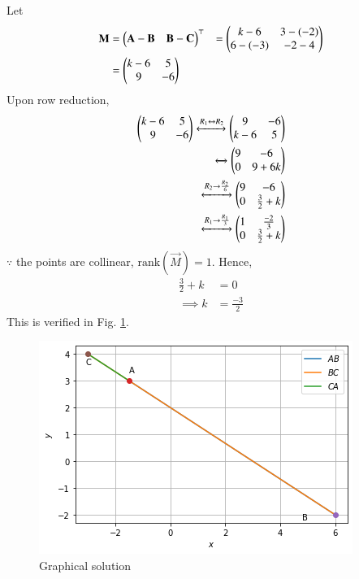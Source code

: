 

Let
\begin{align}
  \mathbf{M} &=  \begin{pmatrix}\mathbf{A}-\mathbf{B}&\mathbf{B}-\mathbf{C}\end{pmatrix}^{\top}
  & = \begin{pmatrix}k-6&3-(-2)\\6-(-3)&-2-4\end{pmatrix} \\
  & =   \begin{pmatrix}k-6&5\\9&-6\end{pmatrix}
\end{align}
Upon row reduction,
\begin{align}
\begin{pmatrix}k-6&5\\9&-6\end{pmatrix}
\xleftrightarrow{R_1\leftrightarrow R_2}
\begin{pmatrix}9&-6\\k-6&5\end{pmatrix}
\\
\xleftrightarrow[]{}
\begin{pmatrix}9&-6\\0&9+6k\end{pmatrix}
\\
\xleftrightarrow{R_2\rightarrow\frac{R_2}{6}}
\begin{pmatrix}9&-6\\0&\frac{3}{2}+k\end{pmatrix}
\\
\xleftrightarrow{R_1\rightarrow \frac{R_1}{3}}
\begin{pmatrix}1&\frac{-2}{3}\\0&\frac{3}{2}+k\end{pmatrix}
\end{align}
$\because$ the points are collinear, $\text{rank}(\vec{M})=1$.  Hence, 
\begin{align}
 \frac{3}{2}+k&=0 \\
\implies k&=\frac{-3}{2}
 \end{align}
This is verified in Fig.     \ref{vec/2008/14/Graphical solution}.
\begin{figure}[ht]
    \centering
    \includegraphics[width=\columnwidth]{vectors/solutions/2008/14/Collinear.png}
    \caption{Graphical solution}
    \label{vec/2008/14/Graphical solution}
\end{figure}



